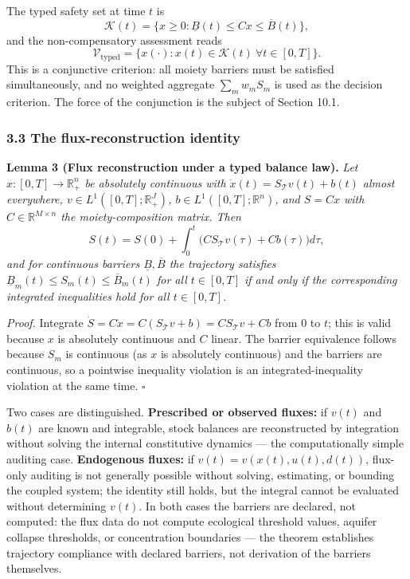 \documentclass[11pt]{article}
\begin{document}
The typed safety set at time \(t\) is
\[\mathcal{K}(t) = \{ x \ge 0 : \underline{B}(t) \le Cx \le \overline{B}(t) \},\]
and the non-compensatory assessment reads
\[\mathcal{V}_{\mathrm{typed}} = \{ x(\cdot) : x(t) \in \mathcal{K}(t)\ \forall t \in [0,T] \}.\]
This is a conjunctive criterion: all moiety barriers must be satisfied
simultaneously, and no weighted aggregate \(\sum_m w_m S_m\) is used as
the decision criterion. The force of the conjunction is the subject of
Section 10.1.

\subsubsection{3.3 The flux-reconstruction
identity}\label{the-flux-reconstruction-identity}

\textbf{Lemma 3 (Flux reconstruction under a typed balance law).}
\emph{Let \(x : [0,T] \to \mathbb{R}_+^n\) be absolutely continuous with
\(\dot x(t) = S_{\mathcal{T}} v(t) + b(t)\) almost everywhere,
\(v \in L^1([0,T]; \mathbb{R}_+^J)\),
\(b \in L^1([0,T]; \mathbb{R}^n)\), and \(S = Cx\) with
\(C \in \mathbb{R}^{M \times n}\) the moiety-composition matrix. Then}
\[S(t) = S(0) + \int_0^t \bigl( C S_{\mathcal{T}} v(\tau) + Cb(\tau) \bigr) d\tau,\]
\emph{and for continuous barriers \(\underline{B}, \overline{B}\) the
trajectory satisfies
\(\underline{B}_m(t) \le S_m(t) \le \overline{B}_m(t)\) for all
\(t \in [0,T]\) if and only if the corresponding integrated inequalities
hold for all \(t \in [0,T]\).}

\emph{Proof.} Integrate
\(\dot S = C\dot x = C(S_{\mathcal{T}} v + b) = C S_{\mathcal{T}} v + Cb\)
from \(0\) to \(t\); this is valid because \(x\) is absolutely
continuous and \(C\) linear. The barrier equivalence follows because
\(S_m\) is continuous (as \(x\) is absolutely continuous) and the
barriers are continuous, so a pointwise inequality violation is an
integrated-inequality violation at the same time. \ensuremath{\square}

Two cases are distinguished. \textbf{Prescribed or observed fluxes:} if
\(v(t)\) and \(b(t)\) are known and integrable, stock balances are
reconstructed by integration without solving the internal constitutive
dynamics --- the computationally simple auditing case.
\textbf{Endogenous fluxes:} if \(v(t) = v(x(t), u(t), d(t))\), flux-only
auditing is not generally possible without solving, estimating, or
bounding the coupled system; the identity still holds, but the integral
cannot be evaluated without determining \(v(t)\). In both cases the
barriers are declared, not computed: the flux data do not compute
ecological threshold values, aquifer collapse thresholds, or
concentration boundaries --- the theorem establishes trajectory
compliance with declared barriers, not derivation of the barriers
themselves.
\end{document}
